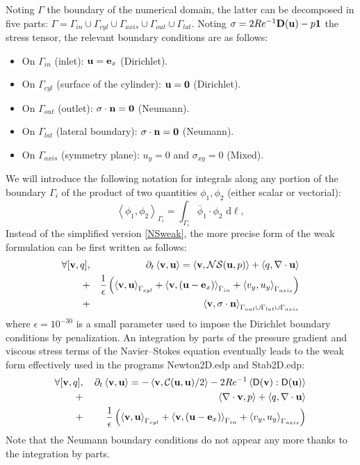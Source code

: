 \documentclass[twocolumn,10pt]{asme2ej}
\begin{document}
Noting $\Gamma$ the boundary of the numerical domain, the latter can be decomposed in five parts: 
$\Gamma = \Gamma_{in} \cup \Gamma_{cyl} \cup \Gamma_{axis} \cup \Gamma_{out} \cup \Gamma_{lat}$. 
Noting $\sigma = 2 Re^{-1} {\bf D}({\bf u}) - p {\bf 1}$ the stress tensor, the relevant boundary conditions are as follows:
\begin{itemize}
\item On $\Gamma_{in}$ (inlet): ${\bf u} = {\bf e}_x$ (Dirichlet).
\item On $\Gamma_{cyl}$ (surface of the cylinder): ${\bf u} = {\bf 0}$ (Dirichlet).
\item On $\Gamma_{out}$ (outlet): $\sigma \cdot {\bf n} = {\bf 0}$ (Neumann). 
\item On $\Gamma_{lat}$ (lateral boundary):  $\sigma \cdot {\bf n} = {\bf 0}$ (Neumann). 
\item On $\Gamma_{axis}$ (symmetry plane): $u_y = 0$ and $\sigma_{xy} = 0$ (Mixed). 
\end{itemize}
We will introduce the following notation for integrals along any portion of the boundary $\Gamma_i$ of the product of two quantities $\phi_1, \phi_2$ (either scalar or vectorial):
$$
\left< \phi_1, \phi_2 \right>_{\Gamma_i} = \int_{\Gamma_i}  \overline{\phi}_1 \cdot \phi_2   \mbox{ d} \ell,
$$
Instead of the simplified version \ref{NSweak}, the more precise form of the weak formulation can be first written as follows:
\begin{eqnarray}
\label{NSweakFull}
\forall [{\bf v},q], &&\quad \partial_t \left< {\bf v}, {\bf u}\right> = \left< {\bf v} , {\cal NS} ({\bf u},p) \right> + \left< q, \nabla \cdot {\bf u}\right>\\
+ &&\frac{1}{\epsilon} \left(  \left< {\bf v}, \bf{u} \right>_{\Gamma_{cyl}} + \left< {\bf v}, ({\bf u}- {\bf e}_x ) \right>_{\Gamma_{in}} 
+ \left< v_y, u_y\right>_{\Gamma_{axis}} \right) \nonumber \\
+ && \left< {\bf v}, \sigma \cdot {\bf n} \right>_{\Gamma_{out} \cup  \Gamma_{lat} \cup \Gamma_{axis} }  \nonumber 
\end{eqnarray}
where $\epsilon=10^{-30}$ is a small parameter used to impose the Dirichlet boundary conditions by penalization.
An integration by parts of the pressure gradient and viscous stress terms of the Navier--Stokes equation eventually 
leads to the weak form effectively used in the programs {\sf Newton2D.edp} and {\sf Stab2D.edp}:
\begin{eqnarray}
\forall [{\bf v},q], &&\, \partial_t \left< {\bf v}, {\bf u}\right> = - \left< {\bf v} , {\cal C}({\bf u},{\bf u})/2 \right>
- 2 Re^{-1} \left< {\mathsf D}({\bf v}): {\mathsf D}({\bf u})  \right>  \nonumber \\
+ &&\left< \nabla \cdot {\bf v}, p \right> + \left< q, \nabla \cdot {\bf u} \right> \label{NSweakFullN} \\
+ &&\frac{1}{\epsilon} \left(  \left< {\bf v}, \bf{u} \right>_{\Gamma_{cyl}} + \left< {\bf v}, ({\bf u}- {\bf e}_x ) \right>_{\Gamma_{in}} 
+ \left< v_y, u_y\right>_{\Gamma_{axis}} \right) \nonumber 
\end{eqnarray}
Note that the Neumann boundary conditions do not appear any more thanks to the integration by parts.
\end{document}
